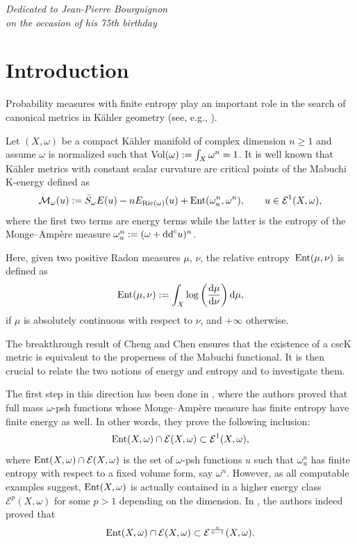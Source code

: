 \documentclass[pdftex]{sigma}
\numberwithin{equation}{section}
\theoremstyle{plain}
\newcommand \vol{{\rm Vol}}
\newcommand \Ent{{\rm Ent}}
\newcommand{\Ric}{{\rm Ric}}
\newcommand \cE{\mathcal E }
\newcommand \cM {\mathcal{M}}
\begin{document}


\begin{flushright}
\begin{minipage}{65mm}
\it Dedicated to Jean-Pierre Bourguignon\\
 on the occasion of his 75th birthday
\end{minipage}
\end{flushright}

\renewcommand{\thefootnote}{\arabic{footnote}}
\setcounter{footnote}{0}


\section{Introduction}

 Probability measures with finite entropy play an important role in the search of canonical metrics in K\"ahler geometry (see, e.g., \cite{BBEGZ19,BBGZ13, BBJ15, BDL17,BEGZ10, ChCh1, ChCh2}).

Let $(X, \omega)$ be a compact K\"ahler manifold of complex dimension $n\geq 1$ and assume $\omega$ is normalized such that $\vol(\omega):=\int_X \omega^n=1$. It is well known that K\"ahler metrics with constant scalar curvature are critical points of the Mabuchi K-energy defined as
\[
\cM_{\omega}(u) := \bar{S}_{\omega} E(u) - n E_{\Ric(\omega)}(u) + \Ent(\omega_u^n, \omega^n), \qquad u \in \cE^1(X,\omega),
\]
where the first two terms are energy terms while the latter is the entropy of the Monge--Amp\`ere measure $\omega_u^n:= (\omega+ {\rm dd}^c u)^n$.

 Here, given two positive Radon measures $\mu$, $\nu$, the relative entropy~$\Ent(\mu, \nu)$ is defined as
\[
\Ent(\mu, \nu) := \int_X \log\left (\frac{{\rm d}\mu}{{\rm d}\nu}\right) {\rm d}\mu,
\]
if $\mu$ is absolutely continuous with respect to $\nu$, and $+\infty$ otherwise.

The breakthrough result of Cheng and Chen \cite{ChCh1, ChCh2} ensures that the existence of a cscK metric is equivalent to the properness of the Mabuchi functional. It is then crucial to relate the two notions of energy and entropy and to investigate them.

The first step in this direction has been done in \cite{BBEGZ19}, where the authors proved that full mass $\omega$-psh functions whose Monge--Amp\`ere measure has finite entropy have finite energy as well. In other words, they prove the following inclusion:
\[
\Ent(X,\omega)\cap \mathcal{E}(X, \omega) \subset {\mathcal E}^1(X,\omega),
\]
 where $\Ent(X,\omega)\cap \mathcal{E}(X, \omega)$ is the set of $\omega$-psh functions $u$ such that $\omega_u^n$ has finite entropy with respect to a fixed volume form, say $\omega^n$.
However, as all computable examples suggest, $\Ent(X,\omega)$ is actually contained in a higher energy class ${\mathcal E}^p(X,\omega)$ for some $p>1$ depending on the dimension.
In \cite{DGL20}, the authors indeed proved that
\[
\Ent(X,\omega)\cap \mathcal{E}(X, \omega) \subset {\mathcal E}^{\frac{n}{n-1}}(X,\omega).
\]
\end{document}
